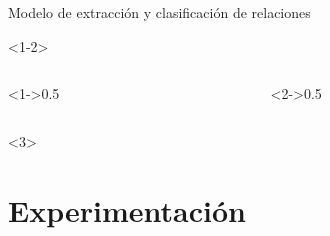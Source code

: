 \documentclass{beamer}
\begin{document}
\begin{frame}{Modelo de extracción y clasificación de relaciones}
    \begin{onlyenv}<1-2>
        \begin{columns}
            \begin{column}<1->{0.5\textwidth}
                \begin{center}
                    
                \end{center}
            \end{column}
            \begin{column}<2->{0.5\textwidth}
                \begin{center}
                    
                \end{center}
            \end{column}
        \end{columns}
    \end{onlyenv}
    \begin{onlyenv}<3>
        \begin{center}
            
        \end{center}
    \end{onlyenv}
\end{frame}

\section{Experimentación}
\end{document}
